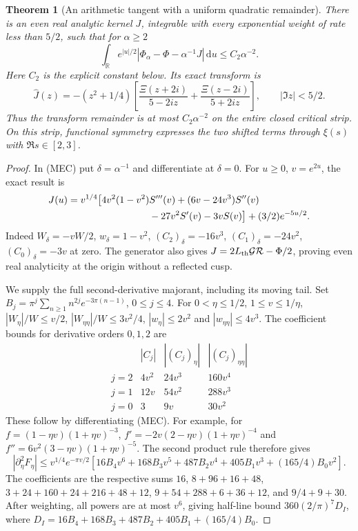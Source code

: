 \documentclass[11pt]{article}
\newtheorem{theorem}{Theorem}
\theoremstyle{remark}\newtheorem{remark}[theorem]{Remark}
\newcommand{\R}{\mathbb R}
\newcommand{\dd}{\,\mathrm d}
\begin{document}
\begin{theorem}[An arithmetic tangent with a uniform quadratic remainder]
\label{thm:mehler-tangent}
There is an even real analytic kernel $J$, integrable with every
exponential weight of rate less than $5/2$, such that for $\alpha\ge2$
\[
 \int_\R e^{|u|/2}
       |\Phi_\alpha-\Phi-\alpha^{-1}J|\dd u\le C_2\alpha^{-2}.
 \tag{MTQ}
\]
Here $C_2$ is the explicit constant below. Its exact transform is
\[
 \widehat J(z)=-(z^2+1/4)
 \left[\frac{\Xi(z+2i)}{5-2iz}+\frac{\Xi(z-2i)}{5+2iz}\right],
                      \qquad|\Im z|<5/2. \tag{MTS}
\]
Thus the transform remainder is at most $C_2\alpha^{-2}$ on the
entire closed critical strip. On this strip, functional symmetry
expresses the two shifted terms through $\xi(s)$ with $\Re s\in[2,3]$.
\end{theorem}
\begin{proof}
In (MEC) put $\delta=\alpha^{-1}$ and differentiate at $\delta=0$.
For $u\ge0$, $v=e^{2u}$, the exact result is
\[
\begin{split}
 J(u)={}&v^{1/4}\bigl[
 4v^2(1-v^2)S'''(v)+(6v-24v^3)S''(v)\\
 &\hspace{25mm}-27v^2S'(v)-3vS(v)\bigr]
                         +(3/2)e^{-5u/2}.
\end{split}
\]
Indeed $W_\delta=-vW/2$, $w_\delta=1-v^2$,
$(C_2)_\delta=-16v^3$, $(C_1)_\delta=-24v^2$,
$(C_0)_\delta=-3v$ at zero. The generator also gives
$J=2L_{\rm th}\mathcal G\mathcal R-\Phi/2$, proving even real
analyticity at the origin without a reflected cusp.

We supply the full second-derivative majorant, including its moving
tail. Set $B_j=\pi^j\sum_{n\ge1}n^{2j}e^{-3\pi(n-1)}$, $0\le j\le4$.
For $0<\eta\le1/2$, $1\le v\le1/\eta$,
$|W_\eta|/W\le v/2$, $|W_{\eta\eta}|/W\le3v^2/4$,
$|w_\eta|\le2v^2$ and $|w_{\eta\eta}|\le4v^3$.
The coefficient bounds for derivative orders $0,1,2$ are
\[
 \begin{array}{c|ccc}
 &|C_j|&|(C_j)_\eta|&|(C_j)_{\eta\eta}|\\ \hline
 j=2&4v^2&24v^3&160v^4\\
 j=1&12v&54v^2&288v^3\\
 j=0&3&9v&30v^2
 \end{array}
\]
These follow by differentiating (MEC). For example, for
$f=(1-\eta v)(1+\eta v)^{-3}$,
$f'=-2v(2-\eta v)(1+\eta v)^{-4}$ and
$f''=6v^2(3-\eta v)(1+\eta v)^{-5}$.
The second product rule therefore gives
\[
 |\partial_\eta^2F_\eta|
 \le v^{1/4}e^{-\pi v/2}
 [16B_4v^6+168B_3v^5+487B_2v^4+405B_1v^3+(165/4)B_0v^2].
\]
The coefficients are the respective sums
$16$, $8+96+16+48$, $3+24+160+24+216+48+12$,
$9+54+288+6+36+12$, and $9/4+9+30$.
After weighting, all powers are at most $v^6$, giving half-line
bound $360(2/\pi)^7D_I$, where
$D_I=16B_4+168B_3+487B_2+405B_1+(165/4)B_0$.


\end{proof}
\end{document}
